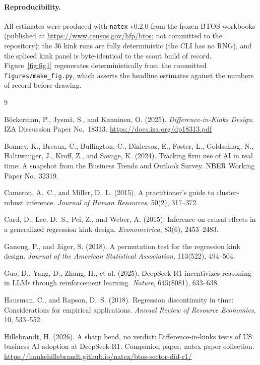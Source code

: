 \documentclass[11pt]{article}
\newcommand{\natex}{\texttt{natex}}
\begin{document}
\paragraph{Reproducibility.} All estimates were produced with \natex{} v0.2.0
\cite{natex} from the frozen BTOS workbooks (published at
\url{https://www.census.gov/hfp/btos}; not committed to the repository); the
36 kink runs are fully deterministic (the CLI has no RNG), and the spliced
kink panel is byte-identical to the scout build of record.
Figure~\ref{fig:fig1} regenerates deterministically from the committed
\texttt{figures/make\_fig.py}, which asserts the headline estimates against
the numbers of record before drawing.

\footnotesize
\begin{thebibliography}{9}
\setlength{\itemsep}{2pt}\setlength{\parskip}{0pt}

B\"ockerman, P., Jysm\"a, S., and Kanninen, O. (2025).
\emph{Difference-in-Kinks Design}.
IZA Discussion Paper No.~18313.
\url{https://docs.iza.org/dp18313.pdf}

Bonney, K., Breaux, C., Buffington, C., Dinlersoz, E., Foster, L., Goldschlag,
N., Haltiwanger, J., Kroff, Z., and Savage, K. (2024).
Tracking firm use of AI in real time: A snapshot from the Business Trends and
Outlook Survey.
NBER Working Paper No.~32319.

Cameron, A.~C., and Miller, D.~L. (2015).
A practitioner's guide to cluster-robust inference.
\emph{Journal of Human Resources}, 50(2), 317--372.

Card, D., Lee, D.~S., Pei, Z., and Weber, A. (2015).
Inference on causal effects in a generalized regression kink design.
\emph{Econometrica}, 83(6), 2453--2483.

Ganong, P., and J\"ager, S. (2018).
A permutation test for the regression kink design.
\emph{Journal of the American Statistical Association}, 113(522), 494--504.

Guo, D., Yang, D., Zhang, H., et al. (2025).
DeepSeek-R1 incentivizes reasoning in LLMs through reinforcement learning.
\emph{Nature}, 645(8081), 633--638.

Hausman, C., and Rapson, D.~S. (2018).
Regression discontinuity in time: Considerations for empirical applications.
\emph{Annual Review of Resource Economics}, 10, 533--552.

Hillebrandt, H. (2026).
A sharp bend, no verdict: Difference-in-kinks tests of US business AI
adoption at DeepSeek-R1.
Companion paper, natex paper collection.
\url{https://haukehillebrandt.github.io/natex/btos-sector-did-r1/}


\end{thebibliography}
\end{document}
